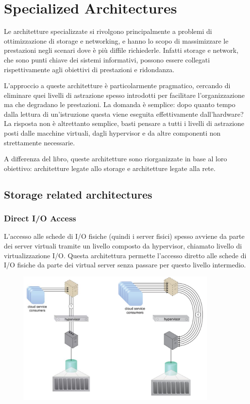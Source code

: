 \chapter{Specialized Architectures}
Le architetture specializzate si rivolgono principalmente a problemi di ottimizzazione di storage e networking, e hanno lo scopo di massimizzare le prestazioni negli scenari dove è più diffile richiederle. Infatti storage e network, che sono punti chiave dei sistemi informativi, possono essere collegati rispettivamente agli obiettivi di prestazioni e ridondanza.

L'approccio a queste architetture è particolarmente pragmatico, cercando di eliminare quei livelli di astrazione spesso introdotti per facilitare l'organizzazione ma che degradano le prestazioni. La domanda è semplice: dopo quanto tempo dalla lettura di un'istruzione questa viene eseguita effettivamente dall'hardware? La risposta non è altrettanto semplice, basti pensare a tutti i livelli di astrazione posti dalle macchine virtuali, dagli hypervisor e da altre componenti non strettamente necessarie.

A differenza del libro, queste architetture sono riorganizzate in base al loro obiettivo: architetture legate allo storage e architetture legate alla rete.

\section{Storage related architectures}
\subsection{Direct I/O Access}
L'accesso alle schede di I/O fisiche (quindi i server fisici) spesso avviene da parte dei server virtuali tramite un livello composto da hypervisor, chiamato livello di virtualizzazione I/O. Questa architettura permette l'accesso diretto alle schede di I/O fisiche da parte dei virtual server senza passare per questo livello intermedio.

\begin{figure}[htb!]
    \centering
    \includegraphics[width=10cm]{./Images/cap13/13.1.png}
\end{figure}

